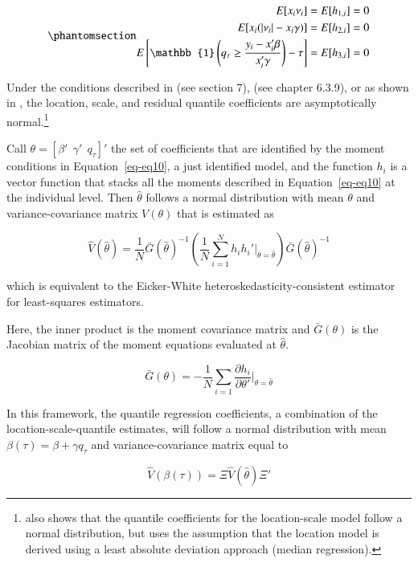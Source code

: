 \documentclass[
  authoryear,
  review,
  1p]{elsarticle}
\begin{document}
\begin{equation}\phantomsection\label{eq-eq10}{\begin{aligned}
  E[x_i \nu_i  ] &= E[h_{1,i}]=0 \\
  E[x_i  (|\nu_i|-x_i \gamma) ] &=E[h_{2,i}]=0 \\
  E\left[  \mathbb{1}\left(   q_\tau\geq \frac{y_i-x_i'\beta}{x_i'\gamma} \right) - \tau \right]  &=E[h_{3,i}]=0 
  \end{aligned}
}\end{equation}

Under the conditions described in \citet{newey_chapter_1994} (see
section 7), \citet{cameron2005} (see chapter 6.3.9), or as shown in
\citet{mss2019}, the location, scale, and residual quantile coefficients
are asymptotically normal.\footnote{\citet{zhao2000} also shows that the
  quantile coefficients for the location-scale model follow a normal
  distribution, but uses the assumption that the location model is
  derived using a least absolute deviation approach (median regression).}

Call \(\theta=[ \beta' \ \ \gamma' \ \ q_\tau ]'\) the set of
coefficients that are identified by the moment conditions in
Equation~\ref{eq-eq10}, a just identified model, and the function
\(h_i\) is a vector function that stacks all the moments described in
Equation~\ref{eq-eq10} at the individual level. Then \(\hat\theta\)
follows a normal distribution with mean \(\theta\) and
variance-covariance matrix \(V(\theta)\) that is estimated as

\[
\hat{V}(\hat\theta)=\frac{1}{N} 
\bar G(\hat\theta)^{-1} 
\left( \frac{1}{N} \sum_{i=1}^N h_i h_i'  \Big|_{\theta=\hat\theta} \right) 
\bar G(\hat\theta)^{-1} 
\]

which is equivalent to the Eicker-White heteroskedasticity-consistent
estimator for least-squares estimators.

Here, the inner product is the moment covariance matrix and
\(\bar{G}(\theta)\) is the Jacobian matrix of the moment equations
evaluated at \(\hat\theta\).

\[\bar{G}(\theta) =-\frac{1}{N} \sum_{i=1} \frac{\partial h_i}{\partial \theta'} \Big|_{\theta=\hat\theta}\]

In this framework, the quantile regression coefficients, a combination
of the location-scale-quantile estimates, will follow a normal
distribution with mean \(\beta(\tau) = \beta+\gamma q_\tau\) and
variance-covariance matrix equal to

\[\hat{V}(\beta(\tau)) = \Xi \hat{V}(\hat\theta) \Xi'
\]
\end{document}
